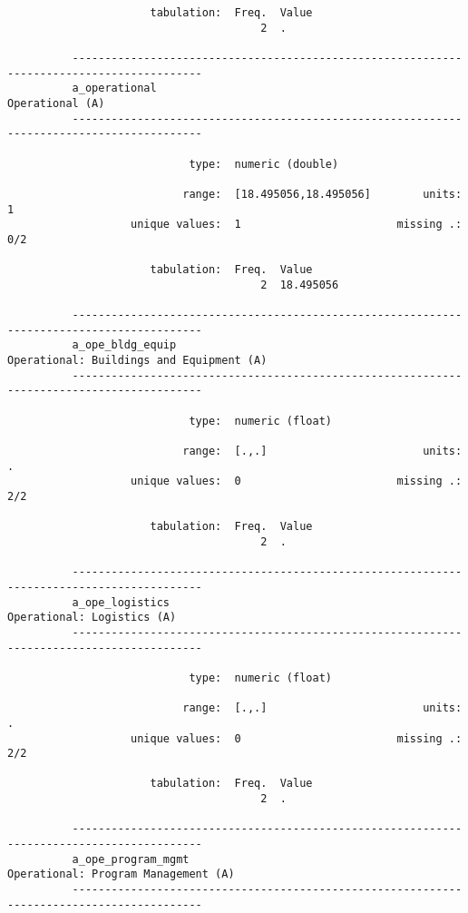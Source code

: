 \documentclass{article}
\begin{document}
\begin{verbatim}
                      tabulation:  Freq.  Value
                                       2  .
          
          ------------------------------------------------------------------------------------------
          a_operational                                                              Operational (A)
          ------------------------------------------------------------------------------------------
          
                            type:  numeric (double)
          
                           range:  [18.495056,18.495056]        units:  1
                   unique values:  1                        missing .:  0/2
          
                      tabulation:  Freq.  Value
                                       2  18.495056
          
          ------------------------------------------------------------------------------------------
          a_ope_bldg_equip                                  Operational: Buildings and Equipment (A)
          ------------------------------------------------------------------------------------------
          
                            type:  numeric (float)
          
                           range:  [.,.]                        units:  .
                   unique values:  0                        missing .:  2/2
          
                      tabulation:  Freq.  Value
                                       2  .
          
          ------------------------------------------------------------------------------------------
          a_ope_logistics                                                 Operational: Logistics (A)
          ------------------------------------------------------------------------------------------
          
                            type:  numeric (float)
          
                           range:  [.,.]                        units:  .
                   unique values:  0                        missing .:  2/2
          
                      tabulation:  Freq.  Value
                                       2  .
          
          ------------------------------------------------------------------------------------------
          a_ope_program_mgmt                                     Operational: Program Management (A)
          ------------------------------------------------------------------------------------------
          

\end{verbatim}
\end{document}
